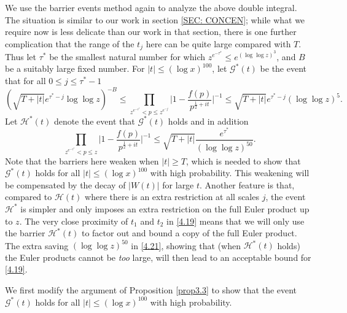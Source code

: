\documentclass[12pt, notitlepage]{amsart}
\numberwithin{equation}{section}
\theoremstyle{remark}
\theoremstyle{definition}
\theoremstyle{remark}
\numberwithin{equation}{section}
\begin{document}
We use the barrier events method again to analyze the above double integral. The situation is similar to our work in section \ref{SEC: CONCEN}; while what we require now is less delicate than our work in that section, there is one further complication that the range of the $t_j$ here can be quite large compared with $T$.  Thus let $\tau^{*}$ be the smallest natural number for which $z^{e^{-\tau^*}} \leq e^{(\log\log z)^3}$, and $B$ be a suitably large fixed number. For $|t| \leq (\log x)^{100}$, let $\mathcal{G}^{*}(t)$ be the event that for all $0\le j\le \tau^* -1$ 
\begin{equation}\label{4.20} 
(\sqrt{T+|t|} e^{\tau^*-j}  \log\log z)^{-B}  \le \prod_{z^{e^{-\tau^*}} <p \le z^{e^{-j}} } \Big|1-\frac{f(p)}{p^{\frac 12+ it}}\Big|^{-1} \le \sqrt{T+|t|} e^{\tau^*-j} (\log \log z)^5 .
\end{equation}
Let $\mathcal{H}^{*}(t)$ denote the event that $\mathcal{G}^{*}(t)$ holds and in addition 
\begin{equation} 
\label{4.21} 
\prod_{z^{e^{-\tau^*}} <p \le z } \Big|1-\frac{f(p)}{p^{\frac 12+ it}}\Big|^{-1} \le \sqrt{T+|t|} \frac{e^{\tau^*}}{ (\log \log z )^{50}}.
\end{equation} 
Note that  the barriers here weaken when $|t| \geq T$, which is needed to show that $\mathcal{G}^{*}(t)$ holds for all $|t|\le (\log x)^{100}$ with high probability.  This weakening will be compensated by the decay of $|W(t)|$ for large $t$.  Another feature is that, compared to $\mathcal{H}(t)$ where there is an extra restriction at all scales $j$, the event $\mathcal{H}^{*}$ is simpler and only imposes an extra restriction on the full Euler product up to $z$. The very close proximity of $t_1$ and $t_2$ in \eqref{4.19} means that we will only use the barrier ${\mathcal H}^*(t)$ to factor out and bound a copy of the full Euler product. The extra saving $(\log\log z)^{50}$ in \eqref{4.21}, showing that (when ${\mathcal H}^*(t)$ holds) the Euler products cannot be {\em too} large, will then lead to an acceptable bound for \eqref{4.19}.

We first modify the argument of Proposition \ref{prop3.3} to show that the event ${\mathcal G}^{*}(t)$ holds for all $|t|\le (\log x)^{100}$ with high probability. 
\end{document}
